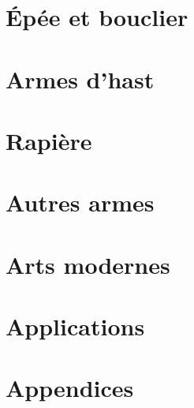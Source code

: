 \documentclass[10pt, a4paper, oneside, titlepage]{book}
\begin{document}





\part{Épée et bouclier}





% 


\part{Armes d'hast}





% 
% 


\part{Rapière}





\part{Autres armes}




\part{Arts modernes}


% 


\part{Applications}
\label{part:applications}



% 




\appendix


\part{Appendices}









\printbibliography[heading=bibintoc]
\printindex
\end{document}
